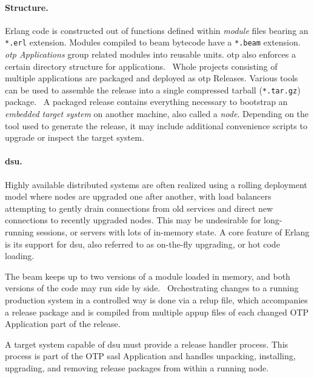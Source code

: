 \cleardoublepage
\paragraph{Structure.}
Erlang code is constructed out of functions defined within \mbox{\emph{module}} files bearing an \lstinline|*.erl| extension. Modules compiled to \acrshort{beam} bytecode have a \lstinline|*.beam| extension. \emph{\acrshort{otp} Applications} group related modules into reusable units. \acrshort{otp} also enforces a certain directory structure for applications.~\cite{logan:otp} Whole projects consisting of multiple applications are packaged and deployed as \acrshort{otp} Releases. Various tools can be used to assemble the release into a single compressed tarball (\lstinline|*.tar.gz|) package.~\cite{doc:otp} A packaged release contains everything necessary to bootstrap an \emph{embedded target system} on another machine, also called a \emph{node}. Depending on the tool used to generate the release, it may include additional convenience scripts to upgrade or inspect the target system.

\paragraph{\acrlong{dsu}.} Highly available distributed systems are often realized using a rolling deployment model where nodes are upgraded one after another, with load balancers attempting to gently drain connections from old services and direct new connections to recently upgraded nodes. This may be undesirable for long-running sessions, or servers with lots of in-memory state. A core feature of Erlang is its support for \acrfull{dsu}, also referred to as on-the-fly upgrading, or hot code loading.

The \acrshort{beam} keeps up to two versions of a module loaded in memory, and both versions of the code may run side by side.~\cite{cesarini:otp} Orchestrating changes to a running production system in a controlled way is done via a \acrfull{relup} file, which accompanies a release package and is compiled from multiple \acrfull{appup} files of each changed OTP Application part of the release.

A target system capable of \acrshort{dsu} must provide a release handler process. This process is part of the OTP \acrfull{sasl} Application and handles unpacking, installing, upgrading, and removing release packages from within a running node.

\cleardoublepage
